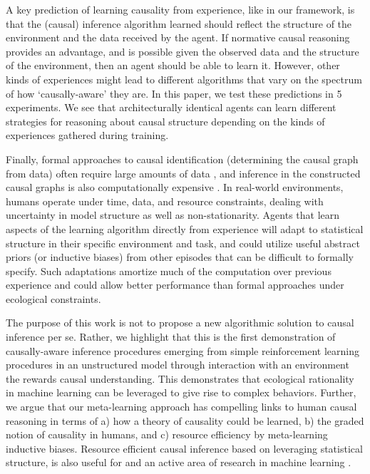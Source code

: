 A key prediction of learning causality from experience, like in our framework, is that the (causal) inference algorithm learned should reflect the structure of the environment and the data received by the agent. If normative causal reasoning provides an advantage, and is possible given the observed data and the structure of the environment, then an agent should be able to learn it. However, other kinds of experiences might lead to different algorithms that vary on the spectrum of how `causally-aware' they are. In this paper, we test these predictions in 5 experiments. We see that architecturally identical agents can learn different strategies for reasoning about causal structure depending on the kinds of experiences gathered during training. 

Finally, formal approaches to causal identification (determining the causal graph from data) often require large amounts of data \citep{geiger1990identifying,spirtes2000causation,verma1991equivalence}, and inference in the constructed causal graphs is also computationally expensive \citep{jordan2002graphical}. In real-world environments, humans operate under time, data, and resource constraints, dealing with uncertainty in model structure as well as non-stationarity. Agents that learn aspects of the learning algorithm directly from experience will adapt to statistical structure in their specific environment and task, and could utilize useful abstract priors (or inductive biases) from other episodes that can be difficult to formally specify. Such adaptations amortize much of the computation over previous experience and could allow better performance than formal approaches under ecological constraints\citep{dasgupta2019theory,gershman2015computational,gigerenzer2009homo,lieder2017strategy,todd2007environments}.  

The purpose of this work is not to propose a new algorithmic solution to causal inference per se. Rather, we highlight that this is the first demonstration of causally-aware inference procedures emerging from simple reinforcement learning procedures in an unstructured model through interaction with an environment the rewards causal understanding. This demonstrates that ecological rationality in machine learning can be leveraged to give rise to complex behaviors. Further, we argue that our meta-learning approach has compelling links to human causal reasoning in terms of a) how a theory of causality could be learned, b) the graded notion of causality in humans, and c) resource efficiency by meta-learning inductive biases. Resource efficient causal inference based on leveraging statistical structure, is also useful for and an active area of research in machine learning \citep[e.g.][]{bengio2019meta, heckerman1995learning,magliacane2018domain,parascandolo2017learning,mitrovic2018causal}.

